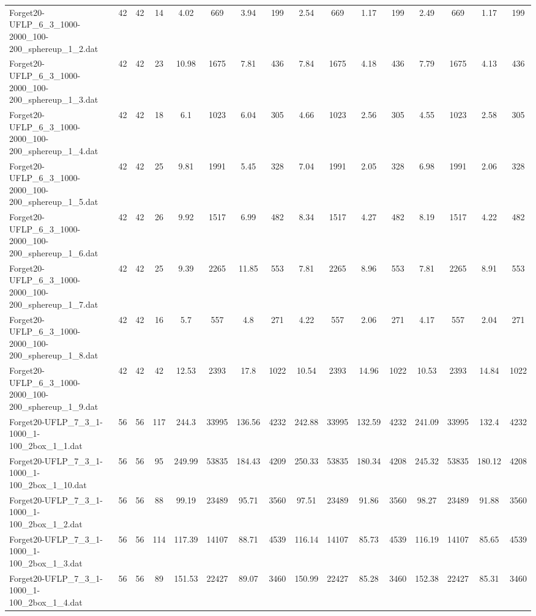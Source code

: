 \begin{sidewaystable}[!ht]
{\begin{tabular}{lccccccccccccccc}
Forget20-UFLP\_6\_3\_1000-2000\_100-200\_sphereup\_1\_2.dat & 42 & 42 & 14 & 4.02 & 669 & 3.94 & 199 & 2.54 & 669 & 1.17 & 199 & 2.49 & 669 & 1.17 & 199 \\
Forget20-UFLP\_6\_3\_1000-2000\_100-200\_sphereup\_1\_3.dat & 42 & 42 & 23 & 10.98 & 1675 & 7.81 & 436 & 7.84 & 1675 & 4.18 & 436 & 7.79 & 1675 & 4.13 & 436 \\
Forget20-UFLP\_6\_3\_1000-2000\_100-200\_sphereup\_1\_4.dat & 42 & 42 & 18 & 6.1 & 1023 & 6.04 & 305 & 4.66 & 1023 & 2.56 & 305 & 4.55 & 1023 & 2.58 & 305 \\
Forget20-UFLP\_6\_3\_1000-2000\_100-200\_sphereup\_1\_5.dat & 42 & 42 & 25 & 9.81 & 1991 & 5.45 & 328 & 7.04 & 1991 & 2.05 & 328 & 6.98 & 1991 & 2.06 & 328 \\
Forget20-UFLP\_6\_3\_1000-2000\_100-200\_sphereup\_1\_6.dat & 42 & 42 & 26 & 9.92 & 1517 & 6.99 & 482 & 8.34 & 1517 & 4.27 & 482 & 8.19 & 1517 & 4.22 & 482 \\
Forget20-UFLP\_6\_3\_1000-2000\_100-200\_sphereup\_1\_7.dat & 42 & 42 & 25 & 9.39 & 2265 & 11.85 & 553 &  \textcolor{blue2}{7.81} & 2265 & 8.96 & 553 &  \textcolor{blue2}{7.81} & 2265 & 8.91 & 553 \\
Forget20-UFLP\_6\_3\_1000-2000\_100-200\_sphereup\_1\_8.dat & 42 & 42 & 16 & 5.7 & 557 & 4.8 & 271 & 4.22 & 557 & 2.06 & 271 & 4.17 & 557 & 2.04 & 271 \\
Forget20-UFLP\_6\_3\_1000-2000\_100-200\_sphereup\_1\_9.dat & 42 & 42 & 42 & 12.53 & 2393 & 17.8 & 1022 & 10.54 & 2393 & 14.96 & 1022 & 10.53 & 2393 & 14.84 & 1022 \\
Forget20-UFLP\_7\_3\_1-1000\_1-100\_2box\_1\_1.dat & 56 & 56 & 117 & 244.3 & 33995 & 136.56 & 4232 & 242.88 & 33995 & 132.59 & 4232 & 241.09 & 33995 &  \textcolor{blue2}{132.4} & 4232 \\
Forget20-UFLP\_7\_3\_1-1000\_1-100\_2box\_1\_10.dat & 56 & 56 & 95 & 249.99 & 53835 & 184.43 & 4209 & 250.33 & 53835 & 180.34 & 4208 & 245.32 & 53835 &  \textcolor{blue2}{180.12} & 4208 \\
Forget20-UFLP\_7\_3\_1-1000\_1-100\_2box\_1\_2.dat & 56 & 56 & 88 & 99.19 & 23489 & 95.71 & 3560 & 97.51 & 23489 & 91.86 & 3560 & 98.27 & 23489 & 91.88 & 3560 \\
Forget20-UFLP\_7\_3\_1-1000\_1-100\_2box\_1\_3.dat & 56 & 56 & 114 & 117.39 & 14107 & 88.71 & 4539 & 116.14 & 14107 & 85.73 & 4539 & 116.19 & 14107 &  \textcolor{blue2}{85.65} & 4539 \\
Forget20-UFLP\_7\_3\_1-1000\_1-100\_2box\_1\_4.dat & 56 & 56 & 89 & 151.53 & 22427 & 89.07 & 3460 & 150.99 & 22427 & 85.28 & 3460 & 152.38 & 22427 & 85.31 & 3460 \\

\end{tabular}}
\end{sidewaystable}
